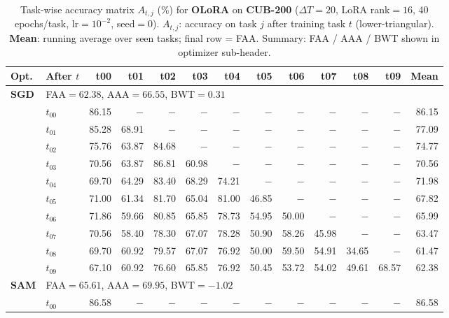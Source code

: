 \begin{table}[ht]
\centering
\caption{%
  Task-wise accuracy matrix $A_{t,j}$ (\%) for \textbf{OLoRA} on \textbf{CUB-200}
  ($\Delta T=20$, LoRA rank$=16$, 40 epochs/task, lr$=10^{-2}$, seed$=0$).
  $A_{t,j}$: accuracy on task $j$ after training task $t$ (lower-triangular).
  \textbf{Mean}: running average over seen tasks; final row = FAA.
  Summary: FAA / AAA / BWT shown in optimizer sub-header.
}
\label{tab:raw_olora_cub200}
\setlength{\tabcolsep}{2.8pt}
\renewcommand{\arraystretch}{0.88}
\scriptsize
\begin{tabular}{@{}l l r r r r r r r r r r r@{}}
\toprule
\textbf{Opt.} & \textbf{After $t$} & \textbf{t00} & \textbf{t01} & \textbf{t02} & \textbf{t03} & \textbf{t04} & \textbf{t05} & \textbf{t06} & \textbf{t07} & \textbf{t08} & \textbf{t09} & \textbf{Mean} \\
\midrule
\multirow{11}{*}{\textbf{SGD}} & \multicolumn{12}{l}{\quad\small FAA$=62.38$,\; AAA$=66.55$,\; BWT$=0.31$} \\
 & $t_{00}$ & 86.15 & $-$ & $-$ & $-$ & $-$ & $-$ & $-$ & $-$ & $-$ & $-$ & 86.15 \\
 & $t_{01}$ & 85.28 & 68.91 & $-$ & $-$ & $-$ & $-$ & $-$ & $-$ & $-$ & $-$ & 77.09 \\
 & $t_{02}$ & 75.76 & 63.87 & 84.68 & $-$ & $-$ & $-$ & $-$ & $-$ & $-$ & $-$ & 74.77 \\
 & $t_{03}$ & 70.56 & 63.87 & 86.81 & 60.98 & $-$ & $-$ & $-$ & $-$ & $-$ & $-$ & 70.56 \\
 & $t_{04}$ & 69.70 & 64.29 & 83.40 & 68.29 & 74.21 & $-$ & $-$ & $-$ & $-$ & $-$ & 71.98 \\
 & $t_{05}$ & 71.00 & 61.34 & 81.70 & 65.04 & 81.00 & 46.85 & $-$ & $-$ & $-$ & $-$ & 67.82 \\
 & $t_{06}$ & 71.86 & 59.66 & 80.85 & 65.85 & 78.73 & 54.95 & 50.00 & $-$ & $-$ & $-$ & 65.99 \\
 & $t_{07}$ & 70.56 & 58.40 & 78.30 & 67.07 & 78.28 & 50.90 & 58.26 & 45.98 & $-$ & $-$ & 63.47 \\
 & $t_{08}$ & 69.70 & 60.92 & 79.57 & 67.07 & 76.92 & 50.00 & 59.50 & 54.91 & 34.65 & $-$ & 61.47 \\
 & $t_{09}$ & 67.10 & 60.92 & 76.60 & 65.85 & 76.92 & 50.45 & 53.72 & 54.02 & 49.61 & 68.57 & 62.38 \\
\midrule
\multirow{11}{*}{\textbf{SAM}} & \multicolumn{12}{l}{\quad\small FAA$=65.61$,\; AAA$=69.95$,\; BWT$=-1.02$} \\
 & $t_{00}$ & 86.58 & $-$ & $-$ & $-$ & $-$ & $-$ & $-$ & $-$ & $-$ & $-$ & 86.58 \\

\end{tabular}
\end{table}
